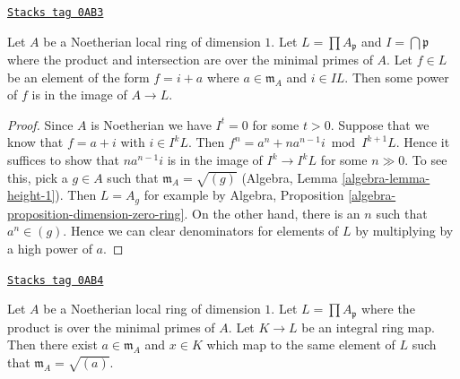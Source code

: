 \begin{lemma}
\label{varieties-lemma-power-works}
\href{https://stacks.math.columbia.edu/tag/0AB3}{\texttt{Stacks tag 0AB3}}

Let $A$ be a Noetherian local ring of dimension $1$.
Let $L = \prod A_\mathfrak p$ and $I = \bigcap \mathfrak p$
where the product and intersection are over
the minimal primes of $A$. Let $f \in L$ be an element
of the form $f = i + a$ where $a \in \mathfrak m_A$ and
$i \in IL$. Then some power of $f$ is in the image of $A \to L$.
\end{lemma}

\begin{proof}
Since $A$ is Noetherian we have $I^t = 0$ for some $t > 0$.
Suppose that we know that $f = a + i$ with $i \in I^kL$.
Then $f^n = a^n + na^{n - 1}i \bmod I^{k + 1}L$.
Hence it suffices to show that $na^{n - 1}i$ is in
the image of $I^k \to I^kL$ for some $n \gg 0$.
To see this, pick a $g \in A$ such that $\mathfrak m_A = \sqrt{(g)}$
(Algebra, Lemma \ref{algebra-lemma-height-1}). Then $L = A_g$ for example by
Algebra, Proposition \ref{algebra-proposition-dimension-zero-ring}.
On the other hand, there is an $n$ such that $a^n \in (g)$.
Hence we can clear denominators for elements of $L$
by multiplying by a high power of $a$.
\end{proof}

\begin{lemma}
\label{varieties-lemma-good-intersection}
\href{https://stacks.math.columbia.edu/tag/0AB4}{\texttt{Stacks tag 0AB4}}

Let $A$ be a Noetherian local ring of dimension $1$.
Let $L = \prod A_\mathfrak p$ where the product is over
the minimal primes of $A$. Let $K \to L$ be an integral ring map.
Then there exist $a \in \mathfrak m_A$ and $x \in K$
which map to the same element of $L$ such that $\mathfrak m_A = \sqrt{(a)}$.
\end{lemma}

